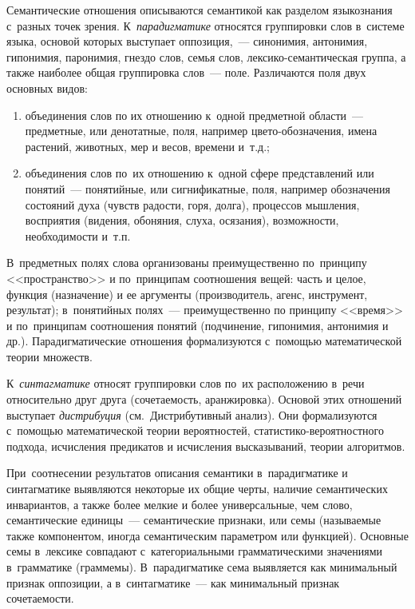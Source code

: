 \documentclass[12pt]{article}
\theoremstyle{definition}
\theoremstyle{remark}
\numberwithin{equation}{section}
\begin{document}
Семантические отношения описываются семантикой как разделом языкознания
с~разных точек зрения. К~{\sl парадигматике} относятся группировки слов в~системе
языка, основой которых выступает оппозиция,~--- синонимия, антонимия, гипонимия,
паронимия, гнездо слов, семья слов, лексико-семантическая группа, а также
наиболее общая группировка слов~--- поле. Различаются поля двух основных
видов:
\begin{enumerate}
    \item объединения слов по их отношению к~одной предметной области~---
    предметные, или денотатные, поля, например цвето-обозначения, имена
    растений, животных, мер и весов, времени и~т.д.;
    \item объединения слов по~их отношению к~одной сфере представлений или
    понятий~--- понятийные, или сигнификатные, поля, например обозначения
    состояний духа (чувств радости, горя, долга), процессов мышления,
    восприятия (видения, обоняния, слуха, осязания), возможности, необходимости
    и~т.п.
\end{enumerate}
В~предметных полях слова организованы преимущественно по~принципу <<пространство>>
и по~принципам соотношения вещей: часть и целое, функция (назначение) и ее
аргументы (производитель, агенс, инструмент, результат); в~понятийных полях~---
преимущественно по принципу <<время>> и по~принципам соотношения понятий
(подчинение, гипонимия, антонимия и др.). Парадигматические отношения
формализуются с~помощью математической теории множеств.

К~{\sl синтагматике} относят группировки слов по~их расположению в~речи
относительно друг друга (сочетаемость, аранжировка). Основой этих отношений
выступает {\sl дистрибуция} (см.~Дистрибутивный анализ). Они формализуются
с~помощью математической теории вероятностей, статистико-вероятностного
подхода, исчисления предикатов и исчисления высказываний, теории алгоритмов.

При~соотнесении результатов описания семантики в~парадигматике и синтагматике
выявляются некоторые их общие черты, наличие семантических инвариантов,
а также более мелкие и более универсальные, чем слово, семантические
единицы~--- семантические признаки, или семы (называемые также компонентом,
иногда семантическим параметром или функцией). Основные семы в~лексике совпадают
с~категориальными грамматическими значениями в~грамматике (граммемы).
В~парадигматике сема выявляется как минимальный признак оппозиции,
а в~синтагматике~--- как минимальный признак сочетаемости.
\end{document}
